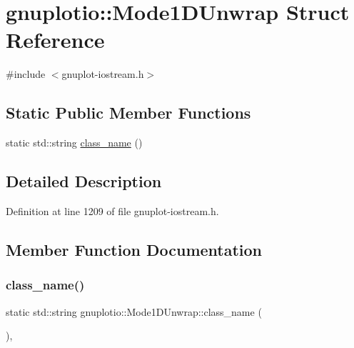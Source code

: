 \hypertarget{structgnuplotio_1_1_mode1_d_unwrap}{}\section{gnuplotio\+:\+:Mode1\+D\+Unwrap Struct Reference}
\label{structgnuplotio_1_1_mode1_d_unwrap}


{\ttfamily \#include $<$gnuplot-\/iostream.\+h$>$}

\subsection*{Static Public Member Functions}
\begin{DoxyCompactItemize}
\item 
static std\+::string \hyperlink{structgnuplotio_1_1_mode1_d_unwrap_a2350096ad4d8b668f6df56c32cab69b6}{class\+\_\+name} ()
\end{DoxyCompactItemize}


\subsection{Detailed Description}


Definition at line 1209 of file gnuplot-\/iostream.\+h.



\subsection{Member Function Documentation}
\mbox{\label{structgnuplotio_1_1_mode1_d_unwrap_a2350096ad4d8b668f6df56c32cab69b6}} 
\subsubsection{\texorpdfstring{class\+\_\+name()}{class\_name()}}
{\footnotesize\ttfamily static std\+::string gnuplotio\+::\+Mode1\+D\+Unwrap\+::class\+\_\+name (\begin{DoxyParamCaption}{ }\end{DoxyParamCaption})\hspace{0.3cm}{\ttfamily [inline]}, {\ttfamily [static]}}



